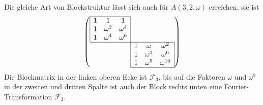 Die gleiche Art von Blockstruktur lässt sich auch für $A(3,2,\omega)$
erreichen, sie ist
\[
\left(
\def\l#1{\multicolumn{1}{|c}{#1}}
\def\r#1{\multicolumn{1}{c|}{#1}}
\begin{array}{cccccc}
\cline{1-3}
\l{1}&       1&\r{       1}&     &        &            \\
\l{1}&\omega^2&\r{\omega^4}&     &        &            \\
\l{1}&\omega^4&\r{\omega^6}&     &        &            \\
\cline{1-6}
     &        &            &\l{1}&\omega  &\r{\omega^2}\\
     &        &            &\l{1}&\omega^3&\r{\omega^6}\\
     &        &            &\l{1}&\omega^5&\r{\omega^{10}}\\
\cline{4-6}
\end{array}
\right)
\]
Die Blockmatrix in der linken oberen Ecke ist $\mathscr{F}_3$,
bis auf die Faktoren $\omega$ und $\omega^2$ in der zweiten
und dritten Spalte ist auch der Block rechts unten eine
Fourier-Transformation $\mathscr{F}_3$.

